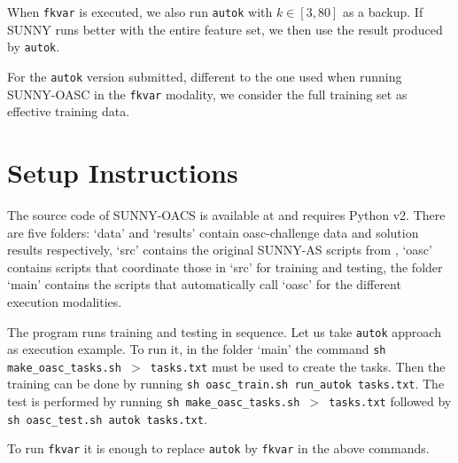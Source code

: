 \documentclass[tablecaption=bottom,wcp]{jmlr} %
\begin{document}
When \texttt{fkvar} is executed, we also run 
\texttt{autok} with $k \in [3,80]$ as a backup. If SUNNY runs better with the 
entire feature set, we then use the result produced by \texttt{autok}.

For the \texttt{autok} version submitted, different to the one used when 
running SUNNY-OASC in the \texttt{fkvar} modality, we consider the 
full training set as effective training data. 

\section{Setup Instructions}

The source code of SUNNY-OACS is available at \cite{sunnyoasc} and requires 
Python v2. There are five folders: `data' and `results' contain oasc-challenge 
data and solution results respectively, `src' contains the original SUNNY-AS 
scripts from \cite{sunnyas}, `oasc' contains scripts that coordinate those in 
`src' for training and testing, the folder `main' contains the scripts that 
automatically call `oasc' for the different execution modalities. 

The program runs training and testing in sequence. Let us take \texttt{autok} 
approach as execution example. To run it, in the folder `main' the 
command \texttt{sh make\_oasc\_tasks.sh $>$ tasks.txt} must be used to create 
the tasks. Then the training can be done by running \texttt{sh oasc\_train.sh 
run\_autok tasks.txt}. The test is performed by running \texttt{sh 
make\_oasc\_tasks.sh $>$ tasks.txt} followed by \texttt{sh oasc\_test.sh autok 
tasks.txt}.

To run \texttt{fkvar} it is enough to replace 
 \texttt{autok} by \texttt{fkvar} in the above commands. 

\newpage 



\end{document}
